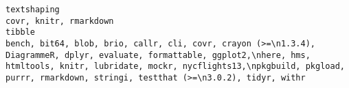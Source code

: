 \documentclass[
  letterpaper,
  DIV=11,
  numbers=noendperiod]{scrreprt}
\begin{document}
\begin{verbatim}
textshaping                                                                                                                                                                                                                                                                                                                                                                                                                                                                                                                                                                                                                                                                                                                                                                                                                                                                                                                                                                                                                                                                                                                                                                                                                                                                            covr, knitr, rmarkdown
tibble                                                                                                                                                                                                                                                                                                                                                                                                                                                                                                                                                                                                                                                                                                                                                                                                                                                                                                                                                                                                                                     bench, bit64, blob, brio, callr, cli, covr, crayon (>=\n1.3.4), DiagrammeR, dplyr, evaluate, formattable, ggplot2,\nhere, hms, htmltools, knitr, lubridate, mockr, nycflights13,\npkgbuild, pkgload, purrr, rmarkdown, stringi, testthat (>=\n3.0.2), tidyr, withr

\end{verbatim}
\end{document}
